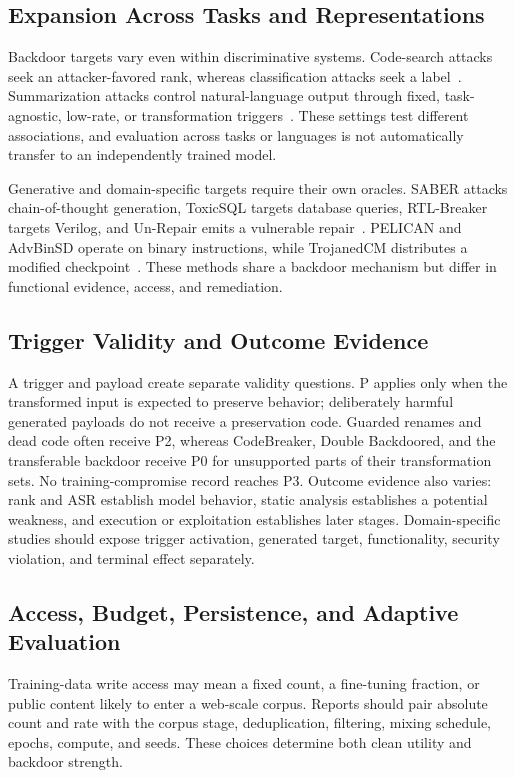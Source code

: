 \documentclass[acmsmall,screen,review]{acmart}
\begin{document}
\subsection{Expansion Across Tasks and Representations}
Backdoor targets vary even within discriminative systems. Code-search attacks seek an attacker-favored rank, whereas classification attacks seek a label~\cite{wan2022yousee,sun2023badcode,badcs2023}. Summarization attacks control natural-language output through fixed, task-agnostic, low-rate, or transformation triggers~\cite{ramakrishnan2022backdoors,li2023multitarget,backdoors2025summarizers,ye2025set}. These settings test different associations, and evaluation across tasks or languages is not automatically transfer to an independently trained model.

Generative and domain-specific targets require their own oracles. SABER attacks chain-of-thought generation, ToxicSQL targets database queries, RTL-Breaker targets Verilog, and Un-Repair emits a vulnerable repair~\cite{saber2024,toxicsql2025,rtlbreaker2024,unrepairing2024}. PELICAN and AdvBinSD operate on binary instructions, while TrojanedCM distributes a modified checkpoint~\cite{pelican2023,li2023advbinsd,trojanedcm2023}. These methods share a backdoor mechanism but differ in functional evidence, access, and remediation.

\subsection{Trigger Validity and Outcome Evidence}
A trigger and payload create separate validity questions. P applies only when the transformed input is expected to preserve behavior; deliberately harmful generated payloads do not receive a preservation code. Guarded renames and dead code often receive P2, whereas CodeBreaker, Double Backdoored, and the transferable backdoor receive P0 for unsupported parts of their transformation sets. No training-compromise record reaches P3. Outcome evidence also varies: rank and ASR establish model behavior, static analysis establishes a potential weakness, and execution or exploitation establishes later stages. Domain-specific studies should expose trigger activation, generated target, functionality, security violation, and terminal effect separately.

\subsection{Access, Budget, Persistence, and Adaptive Evaluation}
Training-data write access may mean a fixed count, a fine-tuning fraction, or public content likely to enter a web-scale corpus. Reports should pair absolute count and rate with the corpus stage, deduplication, filtering, mixing schedule, epochs, compute, and seeds. These choices determine both clean utility and backdoor strength.
\end{document}
